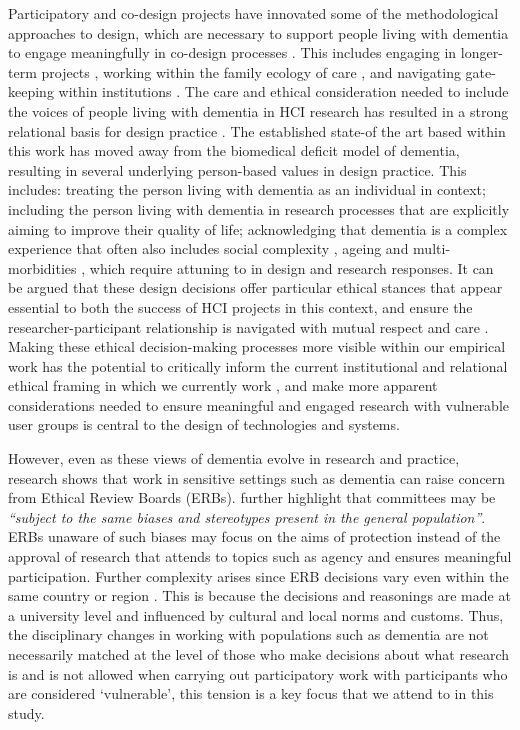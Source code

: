 Participatory and co-design projects have innovated some of the methodological approaches to design, which are necessary to support people living with dementia to engage meaningfully in co-design processes \citep{branco_personalised_2017}. This includes engaging in longer-term projects \citep{hendriks_challenges_2014}, working within the family ecology of care \citep{keady_involving_2007}, and navigating gate-keeping within institutions \citep{sanghera_methodological_2008}. The care and ethical consideration needed to include the voices of people living with dementia in HCI research has resulted in a strong relational basis for design practice \citep{bartlett_citizenship_2014,kontos_integrating_2018}. The established state-of the art based within this work has moved away from the biomedical deficit model of dementia, resulting in several underlying person-based values in design practice. This includes: treating the person living with dementia as an individual in context; including the person living with dementia in research processes that are explicitly aiming to improve their quality of life; acknowledging that dementia is a complex experience that often also includes social complexity \citep{keyes2019living}, ageing and multi-morbidities \citep{buse_materialising_2016}, which require attuning to in design and research responses. It can be argued that these design decisions offer particular ethical stances that appear essential to both the success of HCI projects in this context, and ensure the researcher-participant relationship is navigated with mutual respect and care \citep{foley_care_2019}. Making these ethical decision-making processes more visible within our empirical work has the potential to critically inform the current institutional and relational ethical framing in which we currently work \citep{oyebode_mental_2005}, and make more apparent considerations needed to ensure meaningful and engaged research with vulnerable user groups is central to the design of technologies and systems. 

However, even as these views of dementia evolve in research and practice, research shows that work in sensitive settings such as dementia can raise concern from Ethical Review Boards (ERBs). \cite{pachana_can_2014} further highlight that committees may be \textit{“subject to the same biases and stereotypes present in the general population”}. ERBs unaware of such biases may focus on the aims of protection instead of the approval of research that attends to topics such as agency and ensures meaningful participation. Further complexity arises since ERB decisions vary even within the same country or region \citep{edwards_research_2004}. This is because the decisions and reasonings are made at a university level and influenced by cultural and local norms and customs. Thus, the disciplinary changes in working with populations such as dementia are not necessarily matched at the level of those who make decisions about what research is and is not allowed when carrying out participatory work with participants who are considered ‘vulnerable’, this tension is a key focus that we attend to in this study.

